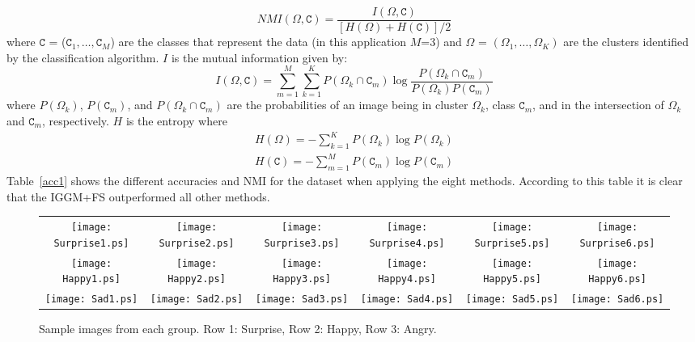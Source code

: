 \documentclass[journal,10pt]{elsart}
\begin{document}
\begin{equation}\label{NMI}
NMI(\Omega, \texttt{C}) = \frac{I(\Omega, \texttt{C})}{[H(\Omega)+H(\texttt{C})]/2}
\end{equation}
where $\texttt{C}$ =  ($\texttt{C}_1,\ldots, \texttt{C}_M$) are the classes that represent the data (in this application $M$=3) and $\Omega$ = $(\Omega_1,\ldots, \Omega_K)$ are the clusters identified by the classification algorithm. $I$ is the mutual information given by:
\begin{equation}\label{MI}
I(\Omega, \texttt{C}) = \sum_{m=1}^{M}\sum_{k=1}^{K}P(\Omega_k\cap \texttt{C}_m) \log\frac{P(\Omega_k\cap \texttt{C}_m)}{P(\Omega_k) P(\texttt{C}_m)}
\end{equation}
where $P(\Omega_k)$, $P(\texttt{C}_m)$, and $P(\Omega_k\cap \texttt{C}_m)$ are the probabilities of an image being in cluster $\Omega_k$, class $\texttt{C}_m$, and in the intersection of $\Omega_k$ and $\texttt{C}_m$, respectively.
$H$ is the entropy where
\begin{eqnarray}\label{entropy}
\nonumber H(\Omega)= -\sum_{k=1}^{K} P(\Omega_k) \log P(\Omega_k) \\H(\texttt{C})= -\sum_{m=1}^{M} P(\texttt{C}_m) \log P(\texttt{C}_m)
\end{eqnarray}
Table~\ref{acc1} shows the different accuracies and NMI for the dataset when applying the eight methods. According to this table it is clear that the IGGM+FS outperformed all other methods.
\begin{figure*}[!ht]
\begin{center}
\begin{tabular}{cccccc}
 \texttt{[image: Surprise1.ps]}
&
\texttt{[image: Surprise2.ps]}
&
\texttt{[image: Surprise3.ps]}
&
\texttt{[image: Surprise4.ps]}
&
\texttt{[image: Surprise5.ps]}
&
\texttt{[image: Surprise6.ps]}
\\
 \texttt{[image: Happy1.ps]}
&
\texttt{[image: Happy2.ps]}
&
\texttt{[image: Happy3.ps]}
&
\texttt{[image: Happy4.ps]}
&
\texttt{[image: Happy5.ps]}
&
\texttt{[image: Happy6.ps]}
\\
\texttt{[image: Sad1.ps]}
&
\texttt{[image: Sad2.ps]}
&
\texttt{[image: Sad3.ps]}
&
\texttt{[image: Sad4.ps]}
&
\texttt{[image: Sad5.ps]}
&
\texttt{[image: Sad6.ps]}
\end{tabular}
\caption{Sample images from each group. Row 1: Surprise, Row 2: Happy, Row 3: Angry.} \label{expressions}
\end{center}
\end{figure*}
\end{document}
